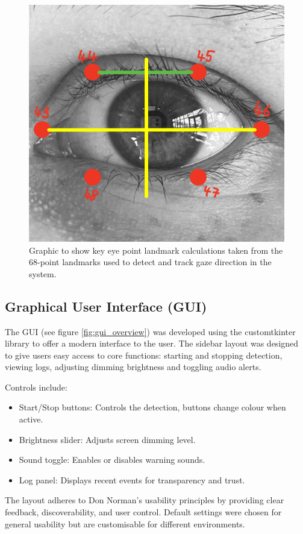 \documentclass[12pt]{article}
\theoremstyle{plain}
\theoremstyle{definition}
\begin{document}
\begin{figure}[h!]
    \centering
    \includegraphics[width=0.6\linewidth]{img/Eye_calc.jpg}
    \caption{Graphic to show key eye point landmark calculations taken from the 68-point landmarks used to detect and track gaze direction in the system.}
    \label{fig:eye_calc}
\end{figure}

\subsection{Graphical User Interface (GUI)}
\label{gui}

The GUI (see figure \ref{fig:gui_overview}) was developed using the customtkinter library to offer a modern interface to the user. The sidebar layout was designed to give users easy access to core functions: starting and stopping detection, viewing logs, adjusting dimming brightness and toggling audio alerts.

Controls include:
\begin{itemize}
  \item Start/Stop buttons: Controls the detection, buttons change colour when active.
  \item Brightness slider: Adjusts screen dimming level.
  \item Sound toggle: Enables or disables warning sounds.
  \item Log panel: Displays recent events for transparency and trust.
\end{itemize}

The layout adheres to Don Norman’s usability principles by providing clear feedback, discoverability, and user control. Default settings were chosen for general usability but are customisable for different environments.
\end{document}
